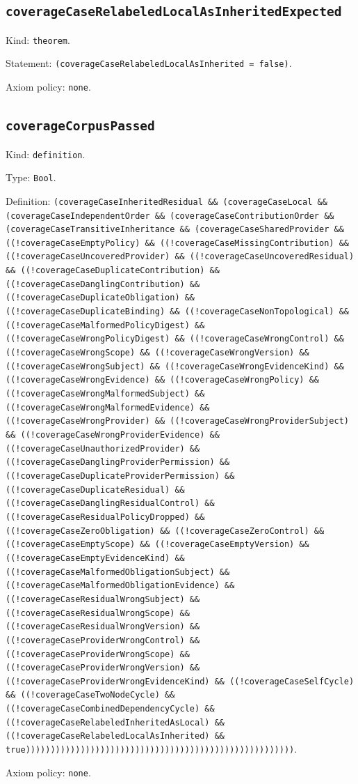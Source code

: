 \documentclass[11pt]{article}
\begin{document}
\subsection*{\texttt{coverageCaseRelabeledLocalAsInheritedExpected}}
\noindent Kind: \texttt{theorem}.\par
\noindent Statement: \texttt{(coverageCaseRelabeledLocalAsInherited = false)}.\par
\noindent Axiom policy: \texttt{none}.\par
\subsection*{\texttt{coverageCorpusPassed}}
\noindent Kind: \texttt{definition}.\par
\noindent Type: \texttt{Bool}.\par
\noindent Definition: \texttt{(coverageCaseInheritedResidual \&\& (coverageCaseLocal \&\& (coverageCaseIndependentOrder \&\& (coverageCaseContributionOrder \&\& (coverageCaseTransitiveInheritance \&\& (coverageCaseSharedProvider \&\& ((!coverageCaseEmptyPolicy) \&\& ((!coverageCaseMissingContribution) \&\& ((!coverageCaseUncoveredProvider) \&\& ((!coverageCaseUncoveredResidual) \&\& ((!coverageCaseDuplicateContribution) \&\& ((!coverageCaseDanglingContribution) \&\& ((!coverageCaseDuplicateObligation) \&\& ((!coverageCaseDuplicateBinding) \&\& ((!coverageCaseNonTopological) \&\& ((!coverageCaseMalformedPolicyDigest) \&\& ((!coverageCaseWrongPolicyDigest) \&\& ((!coverageCaseWrongControl) \&\& ((!coverageCaseWrongScope) \&\& ((!coverageCaseWrongVersion) \&\& ((!coverageCaseWrongSubject) \&\& ((!coverageCaseWrongEvidenceKind) \&\& ((!coverageCaseWrongEvidence) \&\& ((!coverageCaseWrongPolicy) \&\& ((!coverageCaseWrongMalformedSubject) \&\& ((!coverageCaseWrongMalformedEvidence) \&\& ((!coverageCaseWrongProvider) \&\& ((!coverageCaseWrongProviderSubject) \&\& ((!coverageCaseWrongProviderEvidence) \&\& ((!coverageCaseUnauthorizedProvider) \&\& ((!coverageCaseDanglingProviderPermission) \&\& ((!coverageCaseDuplicateProviderPermission) \&\& ((!coverageCaseDuplicateResidual) \&\& ((!coverageCaseDanglingResidualControl) \&\& ((!coverageCaseResidualPolicyDropped) \&\& ((!coverageCaseZeroObligation) \&\& ((!coverageCaseZeroControl) \&\& ((!coverageCaseEmptyScope) \&\& ((!coverageCaseEmptyVersion) \&\& ((!coverageCaseEmptyEvidenceKind) \&\& ((!coverageCaseMalformedObligationSubject) \&\& ((!coverageCaseMalformedObligationEvidence) \&\& ((!coverageCaseResidualWrongSubject) \&\& ((!coverageCaseResidualWrongScope) \&\& ((!coverageCaseResidualWrongVersion) \&\& ((!coverageCaseProviderWrongControl) \&\& ((!coverageCaseProviderWrongScope) \&\& ((!coverageCaseProviderWrongVersion) \&\& ((!coverageCaseProviderWrongEvidenceKind) \&\& ((!coverageCaseSelfCycle) \&\& ((!coverageCaseTwoNodeCycle) \&\& ((!coverageCaseCombinedDependencyCycle) \&\& ((!coverageCaseRelabeledInheritedAsLocal) \&\& ((!coverageCaseRelabeledLocalAsInherited) \&\& true))))))))))))))))))))))))))))))))))))))))))))))))))))))}.\par
\noindent Axiom policy: \texttt{none}.\par
\end{document}
